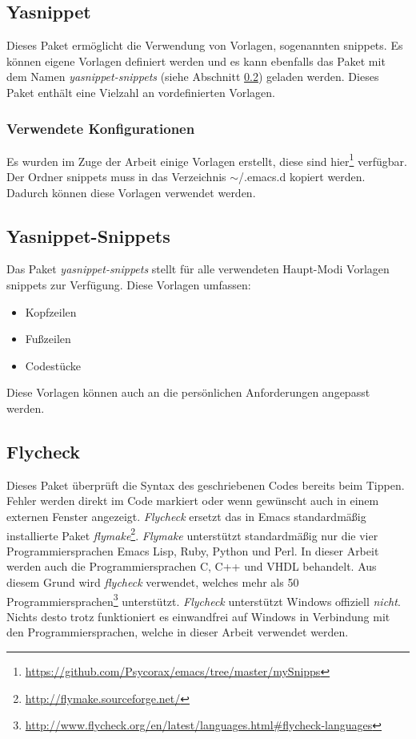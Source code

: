 \subsection{Yasnippet}
\label{subsec:yasnippet}
Dieses Paket ermöglicht die Verwendung von Vorlagen, sogenannten
{\glqq}snippets{\grqq}. Es können eigene Vorlagen definiert werden und
es kann ebenfalls das Paket mit dem Namen \textit{yasnippet-snippets}
(siehe Abschnitt \ref{subsec:yasnippetsnippets}) geladen
werden. Dieses Paket enthält eine Vielzahl an vordefinierten
Vorlagen. \cite{Yasnippet}\\

\subsubsection{Verwendete Konfigurationen}
Es wurden im Zuge der Arbeit einige Vorlagen erstellt, diese sind
hier\footnote{\url{https://github.com/Psycorax/emacs/tree/master/mySnipps}}
verfügbar. Der Ordner {\glqq}snippets{\grqq} muss in das Verzeichnis
{\glqq}$\sim$/.emacs.d{\grqq} kopiert werden. Dadurch können diese
Vorlagen verwendet werden.\\

\subsection{Yasnippet-Snippets}
\label{subsec:yasnippetsnippets}
Das Paket \textit{yasnippet-snippets} stellt für alle verwendeten
Haupt-Modi Vorlagen {\glqq}snippets{\grqq} zur Verfügung. Diese
Vorlagen umfassen:
\begin{itemize}
\item Kopfzeilen
\item Fußzeilen
\item Codestücke
\end{itemize}
Diese Vorlagen können auch an die persönlichen Anforderungen angepasst
werden. \cite{YasnippetSnippets}\\

\subsection{Flycheck}
\label{subsec:flycheck}
Dieses Paket überprüft die Syntax des geschriebenen Codes bereits beim
Tippen. Fehler werden direkt im Code markiert oder wenn gewünscht auch
in einem externen Fenster angezeigt. \textit{Flycheck} ersetzt das in
Emacs standardmäßig installierte Paket
\textit{flymake}\footnote{\url{http://flymake.sourceforge.net/}}. \textit{Flymake}
unterstützt standardmäßig nur die vier Programmiersprachen Emacs Lisp,
Ruby, Python und Perl. In dieser Arbeit werden auch die
Programmiersprachen C, C++ und VHDL behandelt. Aus diesem Grund wird
\textit{flycheck} verwendet, welches mehr als 50
Programmiersprachen\footnote{\url{http://www.flycheck.org/en/latest/languages.html\#flycheck-languages}}
unterstützt. \textit{Flycheck} unterstützt Windows offiziell
\textit{nicht}. Nichts desto trotz funktioniert es einwandfrei auf
Windows in Verbindung mit den Programmiersprachen, welche in dieser
Arbeit verwendet werden. \cite{Flycheck}\\

